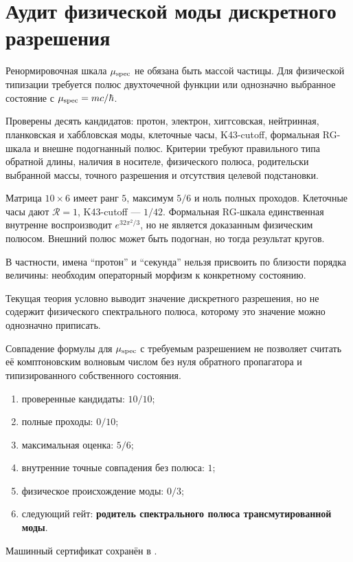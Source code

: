 \chapter{Аудит физической моды дискретного разрешения}
\label{ch:v10-discrete-resolution-physical-mode-audit}

Ренормировочная шкала $\mu_{\rm spec}$ не обязана быть массой частицы.
Для физической типизации требуется полюс двухточечной функции или
однозначно выбранное состояние с
$\mu_{\rm spec}=mc/\hbar$.

Проверены десять кандидатов: протон, электрон, хиггсовская,
нейтринная, планковская и хаббловская моды, клеточные часы, K43-cutoff,
формальная RG-шкала и внешне подогнанный полюс. Критерии требуют правильного
типа обратной длины, наличия в носителе, физического полюса, родительски
выбранной массы, точного разрешения и отсутствия целевой подстановки.

Матрица $10\times6$ имеет ранг $5$, максимум $5/6$ и ноль полных проходов.
Клеточные часы дают $\mathcal R=1$, K43-cutoff --- $1/42$. Формальная
RG-шкала единственная внутренне воспроизводит
$e^{32\pi^2/3}$, но не является доказанным физическим полюсом. Внешний
полюс может быть подогнан, но тогда результат кругов.

В частности, имена ``протон'' и ``секунда'' нельзя присвоить по близости
порядка величины: необходим операторный морфизм к конкретному состоянию.

\begin{theorem}
Текущая теория условно выводит значение дискретного разрешения, но не
содержит физического спектрального полюса, которому это значение можно
однозначно приписать.
\end{theorem}

\begin{nogocriterion}
Совпадение формулы для $\mu_{\rm spec}$ с требуемым разрешением не позволяет
считать её комптоновским волновым числом без нуля обратного пропагатора и
типизированного собственного состояния.
\end{nogocriterion}

\begin{protocol}\begin{enumerate}
\item проверенные кандидаты: \textbf{$10/10$};
\item полные проходы: \textbf{$0/10$};
\item максимальная оценка: \textbf{$5/6$};
\item внутренние точные совпадения без полюса: \textbf{$1$};
\item физическое происхождение моды: \textbf{$0/3$};
\item следующий гейт: \textbf{родитель спектрального полюса трансмутированной моды}.
\end{enumerate}\end{protocol}

Машинный сертификат сохранён в
.
